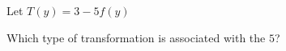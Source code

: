 \documentclass{ximera}
\begin{document}
\begin{exercise}
\begin{question}


Let $T(y) = 3 - 5 f(y)$


Which type of transformation is associated with the $5$?


\begin{multipleChoice}
\end{multipleChoice}


\end{question}










\end{exercise}
\end{document}
